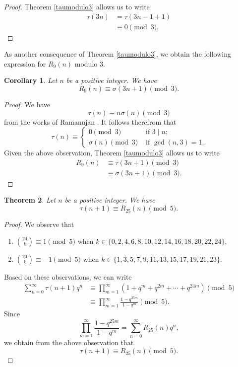 \documentclass[10pt]{article}
\newtheorem{theorem}{Theorem}[section]
\newtheorem{corollary}[theorem]{Corollary}
\theoremstyle{definition}
\begin{document}
\begin{proof}
Theorem \ref{taumodulo3} allows us to write
\begin{align*}
\tau(3n)&=\tau(3n-1+1)\\
&\equiv 0\pmod{3}.
\end{align*}
\end{proof}
As another consequence of Theorem \ref{taumodulo3}, we obtain the following expression for $R_9(n)$ modulo $3$. 
\begin{corollary}
Let $n$ be a positive integer. We have
\begin{equation}
R_9(n)\equiv \sigma(3n+1)\pmod{3}.
\end{equation}
\end{corollary}
\begin{proof}
We have 
\[\tau(n)\equiv n\sigma(n)\pmod{3}
\]
from the works of Ramanujan \cite[p. 112]{george}. 
It follows therefrom that
\[\tau(n)\equiv\begin{cases}
0\pmod{3}&\text{ if }3\mid n;\\
\sigma(n)\pmod{3}&\text{ if }\gcd(n,3)=1.
\end{cases}
\]
Given the above observation, Theorem \ref{taumodulo3} allows us to write
\begin{align*}
R_9(n)&\equiv \tau(3n+1)\pmod{3}\\
&\equiv \sigma(3n+1)\pmod{3}.
\end{align*}
\end{proof}
\begin{theorem}\label{taumodulo5}
Let $n$ be a positive integer. We have
\begin{equation}
\tau(n+1)\equiv R_{25}(n)\pmod{5}.
\end{equation}
\end{theorem}
\begin{proof}
We observe that
\begin{enumerate}
\item ${24\choose{k}}\equiv1\pmod{5}$ when $k\in\{0,2,4,6,8,10,12,14,16,18,20,22,24\}$,
\item ${24\choose{k}}\equiv-1\pmod{5}$ when $k\in\{1,3,5,7,9,11,13,15,17,19,21,23\}$.
\end{enumerate}
Based on these observations, we can write
\begin{align*}
\sum_{n=0}^{\infty}\tau(n+1)q^{n}
&\equiv\prod_{m=1}^{\infty}(1+q^m+q^{2m}+\cdots +q^{24m})\pmod{5}\\
&\equiv\prod_{m=1}^{\infty}\frac{1-q^{25m}}{1-q^m}\pmod{5}.
\end{align*}
Since 
\[\prod_{m=1}^{\infty}\frac{1-q^{25m}}{1-q^m}=\sum_{n=0}^{\infty}R_{25}(n)q^n,
\]
we obtain from the above observation that
\[\tau(n+1)\equiv R_{25}(n)\pmod{5}.
\]
\end{proof}
\end{document}
